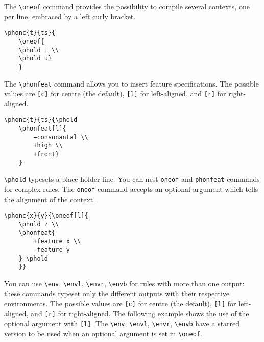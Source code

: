 \documentclass[a4paper]{article}
\begin{document}
The \verb+\oneof+ command provides the possibility to compile several contexts, one per line, embraced by a left curly bracket.

\begin{exe}
\ex
\begin{lstlisting}
\phonc{t}{ts}{
    \oneof{
    \phold i \\
    \phold u}
    }
\end{lstlisting}
\ex {}
\end{exe}

The \verb+\phonfeat+ command allows you to insert feature specifications.
The possible values are \texttt{[c]} for centre (the default), \texttt{[l]} for left-aligned, and \texttt{[r]} for right-aligned.

\begin{exe}
\ex
\begin{lstlisting}
\phonc{t}{ts}{\phold
    \phonfeat[l]{
        −consonantal \\
        +high \\
        +front}
    }
\end{lstlisting}
\ex {}
\end{exe}

\verb+\phold+ typesets a place holder line. You can nest \verb|oneof| and \verb|phonfeat| commands for complex rules.
The \verb|oneof| command accepts an optional argument which tells the alignment of the context.

\begin{exe}
\ex
\begin{lstlisting}
\phonc{x}{y}{\oneof[l]{
    \phold z \\
    \phonfeat{
        +feature x \\
        −feature y
    } \phold
    }}
\end{lstlisting}
\ex {}
\end{exe}

You can use \verb|\env|, \verb|\envl|, \verb|\envr|, \verb|\envb| for rules with more than one output: these commands typeset only the different outputs with their respective environments.
The possible values are \texttt{[c]} for centre (the default), \texttt{[l]} for left-aligned, and \texttt{[r]} for right-aligned.
The following example shows the use of the optional argument with \texttt{[l]}.
The \verb|\env|, \verb|\envl|, \verb|\envr|, \verb|\envb| have a starred version to be used when an optional argument is set in \verb|\oneof|.
\end{document}
